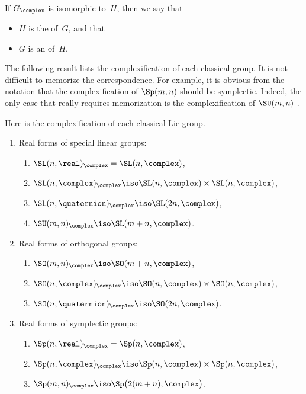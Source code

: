 \begin{defn}
 If $G_{\complex}$ is isomorphic to~$H$, then we say
that 
 \begin{itemize}
 \item $H$ is the  of~$G$, and that
 \item $G$ is an  of~$H$.
 \end{itemize}
 \end{defn}

The following result lists the complexification of each classical group.
It is not difficult to
memorize the correspondence. For example, it is obvious
from the notation that the complexification of $\Sp(m,n)$ should be
symplectic. Indeed, the only case that really requires
memorization is the complexification of $\SU(m,n)$
.

\begin{prop} \label{GxC=}
 Here is the complexification of each classical Lie group.
 \noprelistbreak
	 \begin{enumerate} \renewcommand{\theenumi}{\Alph{enumi}}
			\renewcommand{\theenumii}{\roman{enumii}}
	 \item \label{GxC=-SL}
	 Real forms of special linear groups:
	 \noprelistbreak
	 	\begin{enumerate} 
		 \item $\SL(n,\real)_{\complex} = \SL(n,\complex)$,
		 \item $\SL(n,\complex)_{\complex} \iso \SL(n,\complex)
		\times \SL(n,\complex)$,
		 \item $\SL(n,\quaternion)_{\complex} \iso
		\SL(2n,\complex)$,
		 \item \label{GxC=-SUmn}
		 $\SU(m,n)_{\complex} \iso \SL(m+n,\complex)$.
		 \end{enumerate}

	 \item Real forms of orthogonal groups:
	 \noprelistbreak
	 	\begin{enumerate}
		 \item $\SO(m,n)_{\complex} \iso \SO(m+n,\complex)$,
		 \item $\SO(n,\complex)_{\complex} \iso \SO(n,\complex)
		\times \SO(n,\complex)$,
		 \item $\SO(n,\quaternion)_{\complex} \iso
		\SO(2n,\complex)$.
		 \end{enumerate}

	 \item Real forms of symplectic groups:
	 \noprelistbreak
	 	\begin{enumerate}
		 \item $\Sp(n,\real)_{\complex} = \Sp(n,\complex)$,
		 \item $\Sp(n,\complex)_{\complex} \iso \Sp(n,\complex)
		\times \Sp(n,\complex)$,
		 \item $\Sp(m,n)_{\complex} \iso
		\Sp \bigl( 2(m+n),\complex \bigr)$.
		 \end{enumerate}
	 \end{enumerate}
 \end{prop}

